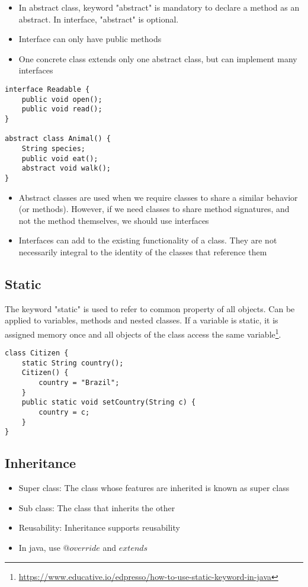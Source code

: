 \documentclass[a4paper, 11.25pt]{article}
\begin{document}
\begin{itemize}
    \item In abstract class, keyword "abstract" is mandatory to declare a method as an abstract. In interface, "abstract" is optional.
    \item Interface can only have public methods
    \item One concrete class extends only one abstract class, but can implement many interfaces
\end{itemize}
\begin{lstlisting}[style=CStyle]
interface Readable {
    public void open();
    public void read();
}

abstract class Animal() {
    String species;
    public void eat();
    abstract void walk();
}\end{lstlisting}

\begin{itemize}
    \item Abstract classes are used when we require classes to share a similar behavior (or methods). However, if we need classes to share method signatures, and not the method themselves, we should use interfaces
    \item Interfaces can add to the existing functionality of a class. They are not necessarily integral to the identity of the classes that reference them
\end{itemize}

\subsection{Static}
The keyword "static" is used to refer to common property of all objects. Can be applied to variables, methods and nested classes. If a variable is static, it is assigned memory once and all objects of the class access the same variable\footnote{\url{https://www.educative.io/edpresso/how-to-use-static-keyword-in-java}}.

\begin{lstlisting}[style=CStyle]
class Citizen {
    static String country();
    Citizen() {
        country = "Brazil";
    }
    public static void setCountry(String c) {
        country = c;
    }
}\end{lstlisting}

\subsection{Inheritance}
\begin{itemize}
    \item Super class: The class whose features are inherited is known as super class
    \item Sub class: The class that inherits the other
    \item Reusability: Inheritance supports reusability
    \item In java, use $@override$ and $extends$
\end{itemize}
\end{document}
